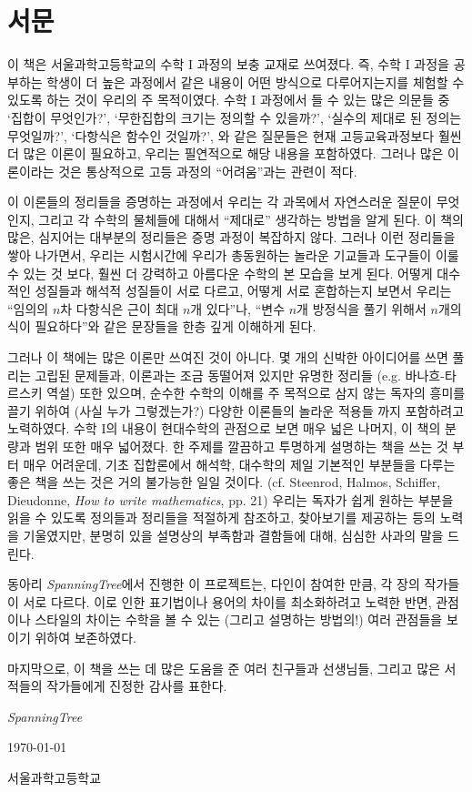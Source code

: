 \chapter{서문}
이 책은 서울과학고등학교의 수학 I 과정의 보충 교재로 쓰여졌다.
즉, 수학 I 과정을 공부하는 학생이 더 높은 과정에서 같은 내용이 어떤 방식으로 다루어지는지를 체험할 수 있도록 하는 것이 우리의 주 목적이였다.
수학 I 과정에서 들 수 있는 많은 의문들 중 `집합이 무엇인가?', `무한집합의 크기는 정의할 수 있을까?', `실수의 제대로 된 정의는 무엇일까?', `다항식은 함수인 것일까?', 와 같은 질문들은 현재 고등교육과정보다 훨씬 더 많은 이론이 필요하고, 우리는 필연적으로 해당 내용을 포함하였다.
그러나 많은 이론이라는 것은 통상적으로 고등 과정의 ``어려움''과는 관련이 적다.

이 이론들의 정리들을 증명하는 과정에서 우리는 각 과목에서 자연스러운 질문이 무엇인지, 그리고 각 수학의 물체들에 대해서 ``제대로'' 생각하는 방법을 알게 된다.
이 책의 많은, 심지어는 대부분의 정리들은 증명 과정이 복잡하지 않다.
그러나 이런 정리들을 쌓아 나가면서, 우리는 시험시간에 우리가 총동원하는 놀라운 기교들과 도구들이 이룰 수 있는 것 보다, 훨씬 더 강력하고 아름다운 수학의 본 모습을 보게 된다.
어떻게 대수적인 성질들과 해석적 성질들이 서로 다르고, 어떻게 서로 혼합하는지 보면서 우리는 ``임의의 $n$차 다항식은 근이 최대 $n$개 있다''나, ``변수 $n$개 방정식을 풀기 위해서 $n$개의 식이 필요하다''와 같은 문장들을 한층 깊게 이해하게 된다.

그러나 이 책에는 많은 이론만 쓰여진 것이 아니다.
몇 개의 신박한 아이디어를 쓰면 풀리는 고립된 문제들과, 이론과는 조금 동떨어져 있지만 유명한 정리들 (e.g. 바나흐-타르스키 역설) 또한 있으며, 순수한 수학의 이해를 주 목적으로 삼지 않는 독자의 흥미를 끌기 위하여 (사실 누가 그렇겠는가?) 다양한 이론들의 놀라운 적용들 까지 포함하려고 노력하였다.
수학 I의 내용이 현대수학의 관점으로 보면 매우 넓은 나머지, 이 책의 분량과 범위 또한 매우 넓어졌다.
한 주제를 깔끔하고 투명하게 설명하는 책을 쓰는 것 부터 매우 어려운데, 기초 집합론에서 해석학, 대수학의 제일 기본적인 부분들을 다루는 좋은 책을 쓰는 것은 거의 불가능한 일일 것이다. (cf. Steenrod, Halmos, Schiffer, Dieudonne, \textit{How to write mathematics}, pp. 21)
우리는 독자가 쉽게 원하는 부분을 읽을 수 있도록 정의들과 정리들을 적절하게 참조하고, 찾아보기를 제공하는 등의 노력을 기울였지만, 분명히 있을 설명상의 부족함과 결함들에 대해, 심심한 사과의 말을 드린다.

동아리 \textit{SpanningTree}에서 진행한 이 프로젝트는, 다인이 참여한 만큼, 각 장의 작가들이 서로 다르다.
이로 인한 표기법이나 용어의 차이를 최소화하려고 노력한 반면, 관점이나 스타일의 차이는 수학을 볼 수 있는 (그리고 설명하는 방법의!) 여러 관점들을 보이기 위하여 보존하였다.

마지막으로, 이 책을 쓰는 데 많은 도움을 준 여러 친구들과 선생님들, 그리고 많은 서적들의 작가들에게 진정한 감사를 표한다.
\medskip
\begin{flushright}
  \textit{SpanningTree}\par
  \today\par
  서울과학고등학교
\end{flushright}